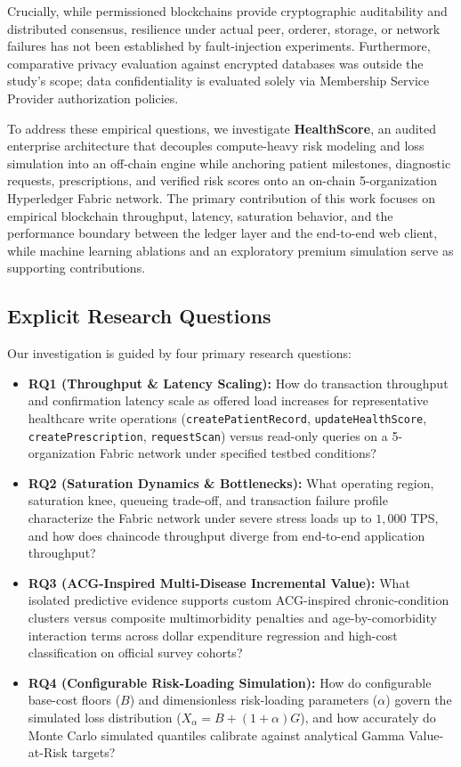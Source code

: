 \documentclass[runningheads]{llncs}
\begin{document}
Crucially, while permissioned blockchains provide cryptographic auditability and distributed consensus, resilience under actual peer, orderer, storage, or network failures has not been established by fault-injection experiments. Furthermore, comparative privacy evaluation against encrypted databases was outside the study's scope; data confidentiality is evaluated solely via Membership Service Provider authorization policies.

To address these empirical questions, we investigate \textbf{HealthScore}, an audited enterprise architecture that decouples compute-heavy risk modeling and loss simulation into an off-chain engine while anchoring patient milestones, diagnostic requests, prescriptions, and verified risk scores onto an on-chain 5-organization Hyperledger Fabric network. The primary contribution of this work focuses on empirical blockchain throughput, latency, saturation behavior, and the performance boundary between the ledger layer and the end-to-end web client, while machine learning ablations and an exploratory premium simulation serve as supporting contributions.

\subsection{Explicit Research Questions}
Our investigation is guided by four primary research questions:
\begin{itemize}
    \item \textbf{RQ1 (Throughput \& Latency Scaling):} How do transaction throughput and confirmation latency scale as offered load increases for representative healthcare write operations (\texttt{createPatientRecord}, \texttt{updateHealthScore}, \texttt{createPrescription}, \texttt{requestScan}) versus read-only queries on a 5-organization Fabric network under specified testbed conditions?
    \item \textbf{RQ2 (Saturation Dynamics \& Bottlenecks):} What operating region, saturation knee, queueing trade-off, and transaction failure profile characterize the Fabric network under severe stress loads up to $1,000$ TPS, and how does chaincode throughput diverge from end-to-end application throughput?
    \item \textbf{RQ3 (ACG-Inspired Multi-Disease Incremental Value):} What isolated predictive evidence supports custom ACG-inspired chronic-condition clusters versus composite multimorbidity penalties and age-by-comorbidity interaction terms across dollar expenditure regression and high-cost classification on official survey cohorts?
    \item \textbf{RQ4 (Configurable Risk-Loading Simulation):} How do configurable base-cost floors ($B$) and dimensionless risk-loading parameters ($\alpha$) govern the simulated loss distribution ($X_\alpha = B + (1+\alpha)G$), and how accurately do Monte Carlo simulated quantiles calibrate against analytical Gamma Value-at-Risk targets?
\end{itemize}
\end{document}
